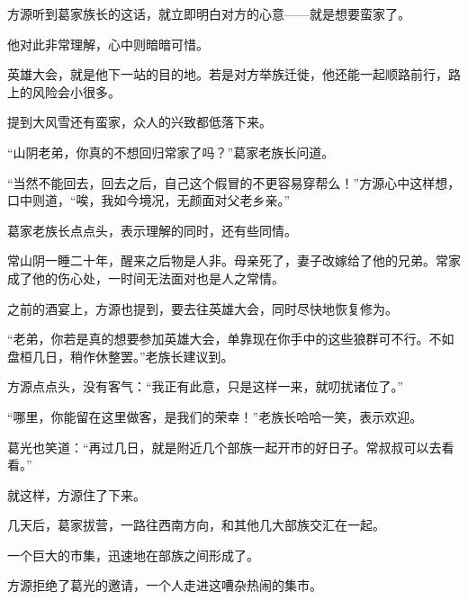 \begin{this_body}
方源听到葛家族长的这话，就立即明白对方的心意——就是想要蛮家了。

他对此非常理解，心中则暗暗可惜。

英雄大会，就是他下一站的目的地。若是对方举族迁徙，他还能一起顺路前行，路上的风险会小很多。

提到大风雪还有蛮家，众人的兴致都低落下来。

“山阴老弟，你真的不想回归常家了吗？”葛家老族长问道。

“当然不能回去，回去之后，自己这个假冒的不更容易穿帮么！”方源心中这样想，口中则道，“唉，我如今境况，无颜面对父老乡亲。”

葛家老族长点点头，表示理解的同时，还有些同情。

常山阴一睡二十年，醒来之后物是人非。母亲死了，妻子改嫁给了他的兄弟。常家成了他的伤心处，一时间无法面对也是人之常情。

之前的酒宴上，方源也提到，要去往英雄大会，同时尽快地恢复修为。

“老弟，你若是真的想要参加英雄大会，单靠现在你手中的这些狼群可不行。不如盘桓几日，稍作休整罢。”老族长建议到。

方源点点头，没有客气：“我正有此意，只是这样一来，就叨扰诸位了。”

“哪里，你能留在这里做客，是我们的荣幸！”老族长哈哈一笑，表示欢迎。

葛光也笑道：“再过几日，就是附近几个部族一起开市的好日子。常叔叔可以去看看。”

就这样，方源住了下来。

几天后，葛家拔营，一路往西南方向，和其他几大部族交汇在一起。

一个巨大的市集，迅速地在部族之间形成了。

方源拒绝了葛光的邀请，一个人走进这嘈杂热闹的集市。

\end{this_body}

